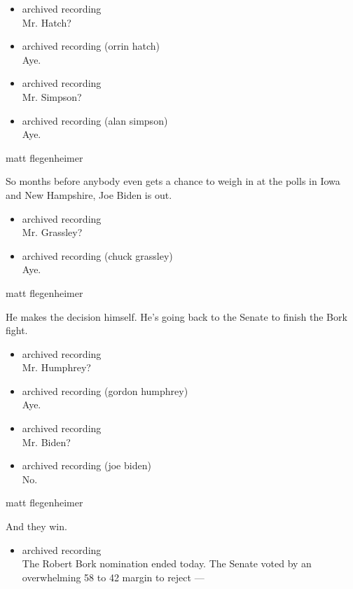 \begin{itemize}
\item
  archived recording\\
  Mr. Hatch?
\item
  archived recording (orrin hatch)\\
  Aye.
\item
  archived recording\\
  Mr. Simpson?
\item
  archived recording (alan simpson)\\
  Aye.
\end{itemize}

matt flegenheimer

So months before anybody even gets a chance to weigh in at the polls in
Iowa and New Hampshire, Joe Biden is out.

\begin{itemize}
\item
  archived recording\\
  Mr. Grassley?
\item
  archived recording (chuck grassley)\\
  Aye.
\end{itemize}

matt flegenheimer

He makes the decision himself. He's going back to the Senate to finish
the Bork fight.

\begin{itemize}
\item
  archived recording\\
  Mr. Humphrey?
\item
  archived recording (gordon humphrey)\\
  Aye.
\item
  archived recording\\
  Mr. Biden?
\item
  archived recording (joe biden)\\
  No.
\end{itemize}

matt flegenheimer

And they win.

\begin{itemize}
\tightlist
\item
  archived recording\\
  The Robert Bork nomination ended today. The Senate voted by an
  overwhelming 58 to 42 margin to reject ---
\end{itemize}

